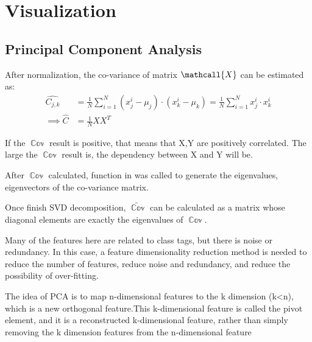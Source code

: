\documentclass[titlepage,a4paper,12pt,thmsb]{report}
\begin{document}
\newpage

\section{Visualization}

\subsection{Principal Component Analysis}


After normalization, the co-variance of matrix $\mathcall{X}$ can be estimated as:
$$
\begin{align}
  \widehat{C_{j,k}} &= \frac{1}{N} \sum_{i=1}^{N} (x_j^i - \mu _j) \cdot (x_k^i - \mu_k) = \frac{1}{N} \sum_{i=1}^{N} x_j^i \cdot x_k^i \\
  \implies \widehat{C} &= \frac{1}{N}XX^T
\end{align}
$$

If the  ${\mathop{\mathbb{Cov}[X,Y]}}$ result is positive, that means that X,Y are positively correlated. The large the ${\mathop{\mathbb{Cov}[X,Y]}}$ result is, the dependency between X and Y will be.

After ${\mathop{\mathbb{Cov}[X]}}$ calculated,  function in  was called to generate the eigenvalues, eigenvectors of the co-variance matrix.

Once finish SVD decomposition, $\widetilde{\mathop{\mathbb{Cov}[X]}}$ can be calculated as a matrix whose diagonal elements are exactly the eigenvalues of ${\mathop{\mathbb{Cov}[X]}}$.

Many of the features here are related to class tags, but there is noise or redundancy. In this case, a feature dimensionality reduction method is needed to reduce the number of features, reduce noise and redundancy, and reduce the possibility of over-fitting.

The idea of PCA is to map n-dimensional features to the k dimension (k<n), which is a new orthogonal feature.This k-dimensional feature is called the pivot element, and it is a reconstructed k-dimensional feature, rather than simply removing the k dimension features from the n-dimensional feature

\newpage
\end{document}
